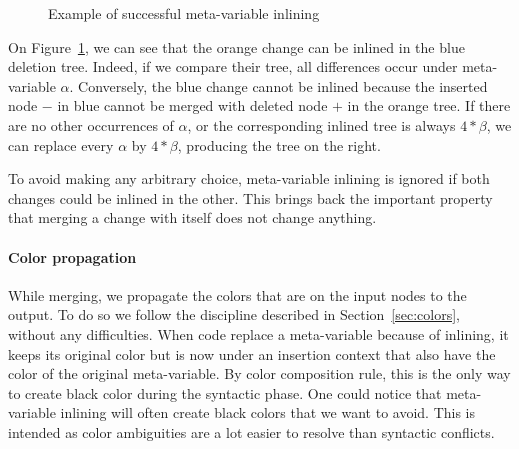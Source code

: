 \documentclass[a4paper,11pt]{article}
\begin{document}
\begin{figure}[ht]
\begin{minipage}{0.49\textwidth}
\end{minipage}
\caption{Example of successful meta-variable inlining}
\label{fig:metavar_inlining}
\end{figure}

On Figure~\ref{fig:metavar_inlining}, we can see that the orange change can be inlined in the blue deletion tree. Indeed, if we compare their tree, all differences occur under meta-variable $\alpha$. Conversely, the blue change cannot be inlined because the inserted node $-$ in blue cannot be merged with deleted node $+$ in the orange tree. If there are no other occurrences of $\alpha$, or the corresponding inlined tree is always $4*\beta$, we can replace every $\alpha$ by $4*\beta$, producing the tree on the right.

To avoid making any arbitrary choice, meta-variable inlining is ignored if both changes could be inlined in the other. This brings back the important property that merging a change with itself does not change anything.

\paragraph{Color propagation}
While merging, we propagate the colors that are on the input nodes to the output. To do so we follow the discipline described in Section~\ref{sec:colors}, without any difficulties. When code replace a meta-variable because of inlining, it keeps its original color but is now under an insertion context that also have the color of the original meta-variable. By color composition rule, this is the only way to create black color during the syntactic phase. One could notice that meta-variable inlining will often create black colors that we want to avoid. This is intended as color ambiguities are a lot easier to resolve than syntactic conflicts.
\end{document}

